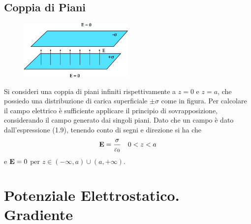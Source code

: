 \subsection{Coppia di Piani}

\begin{figure}  %
    \centering
    \includegraphics[width=0.5\textwidth]{images/double_plane}  %
\end{figure}

Si consideri una coppia di piani infiniti rispettivamente a $z = 0$ e $z=a$, che possiedo una distribuzione di carica superficiale $\pm \sigma$ come in figura. Per calcolare il campo elettrico \`e sufficiente applicare il principio di sovrapposizione, considerando il campo generato dai singoli piani. Dato che un campo \`e dato dall'espressione (1.9), tenendo conto di segni e direzione si ha che 
\begin{equation}
	\bold{E} = \frac{\sigma}{\varepsilon_0} \quad 0<z<a
\end{equation}
e $\bold{E} =0$ per $z \in (-\infty,a) \cup (a,+\infty)$.

\section{Potenziale Elettrostatico. Gradiente}

